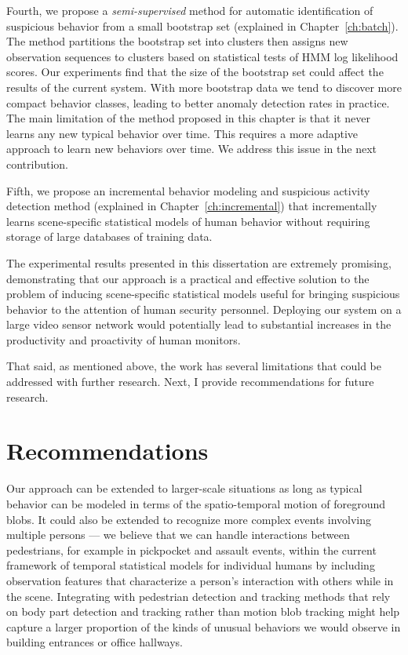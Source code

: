 Fourth, we propose a \textit{semi-supervised} method for automatic
identification of suspicious behavior from a small bootstrap set (explained in
Chapter~\ref{ch:batch}). The method partitions the bootstrap set into clusters
then assigns new observation sequences to clusters based on statistical tests
of HMM log likelihood scores.  Our experiments find that the size of the
bootstrap set could affect the results of the current system.  With more
bootstrap data we tend to discover more compact behavior classes, leading to
better anomaly detection rates in practice. The main limitation of the method
proposed in this chapter is that it never learns any new typical behavior over
time. This requires a more adaptive approach to learn new behaviors over time.
We address this issue in the next contribution. 

Fifth, we propose an incremental behavior modeling and suspicious activity
detection method (explained in Chapter~\ref{ch:incremental}) that incrementally
learns scene-specific statistical models of human behavior without requiring
storage of large databases of training data.

The experimental results presented in this dissertation are extremely
promising, demonstrating that our approach is a practical and effective
solution to the problem of inducing scene-specific statistical models useful
for bringing suspicious behavior to the attention of human security personnel.
Deploying our system on a large video sensor network would potentially lead to
substantial increases in the productivity and proactivity of human monitors.

That said, as mentioned above, the work has several limitations that could be
addressed with further research. Next, I provide recommendations for future
research.

\section{Recommendations}

Our approach can be extended to larger-scale situations as long as typical
behavior can be modeled in terms of the spatio-temporal motion of foreground
blobs.  It could also be extended to recognize more complex events involving
multiple persons --- we believe that we can handle interactions between
pedestrians, for example in pickpocket and assault events, within the current
framework of temporal statistical models for individual humans by including
observation features that characterize a person's interaction with others while
in the scene.  Integrating with pedestrian detection and tracking methods that
rely on body part detection and tracking rather than motion blob tracking might
help capture a larger proportion of the kinds of unusual behaviors we would
observe in building entrances or office hallways.

